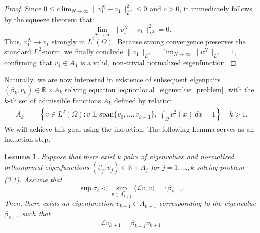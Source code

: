 \documentclass[12pt, a4paper]{article}
\theoremstyle{break}
\theoremstyle{break}
\theoremstyle{break}
\theoremstyle{break}
\theoremstyle{break}
\newtheorem{lem}{Lemma}[section]
\theoremstyle{break}
\theoremstyle{break}
\theoremstyle{break}
\theoremstyle{break}
\begin{document}
\begin{proof}
    Since $0 \leq c \lim_{N \to \infty} \|v_1^N - v_1\|_{L^2}^2 \leq 0$ and $c > 0$, it immediately follows by the squeeze theorem that:
    \begin{equation}
        \lim_{N \to \infty} \|v_1^N - v_1\|_{L^2}^2 = 0.
    \end{equation}
    Thus, $v_1^N \to v_1$ strongly in $L^2(\Omega)$. Because strong convergence preserves the standard $L^2$-norm, we finally conclude $\|v_1\|_{L^2} = \lim_{N \to \infty} \|v_1^N\|_{L^2} = 1$, confirming that $v_1 \in A_1$ is a valid, non-trivial normalized eigenfunction.
\end{proof}

Naturally, we are now interested in existence of subsequent eigenpairs $(\beta_k, v_k) \in \mathbb{R}\times A_k$ solving equation \eqref{eq:nonlocal_eigenvalue_problem}, with the $k$-th set of admissible functions $A_k$ defined by relation
\begin{align}
    \begin{split}
        A_k &= \left\{ v \in L^2(\Omega): v \perp \text{span}\{v_0, \ldots, v_{k-1}\}, \: \int_\Omega v^2(x) \: dx = 1 \right\} \quad k > 1.
    \end{split}
\end{align}
We will achieve this goal using the induction. The following Lemma serves as an induction step.

\begin{lem}
    \label{lem:inductive_step}
    Suppose that there exist $k$ pairs of eigenvalues and normalized orthonormal eigenfunctions $(\beta_j, v_j) \in \mathbb{R} \times A_j$ for $j=1, \ldots, k$ solving problem (3.1). Assume that
    \begin{equation}
        \label{eq:next_beta_inequality}
        \sup \sigma_c < \sup_{v \in A_{k+1}} \langle \mathcal{L}v, v \rangle =: \beta_{k+1}.
    \end{equation}
    Then, there exists an eigenfunction $v_{k+1} \in A_{k+1}$ corresponding to the eigenvalue $\beta_{k+1}$ such that
    \begin{equation}
        \label{eq:next_eigenproblem_solution}
        \mathcal{L}v_{k+1} = \beta_{k+1} v_{k+1}.
    \end{equation}
\end{lem}
\end{document}
